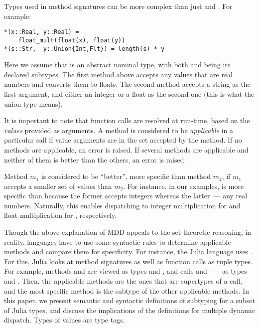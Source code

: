 Types used in method signatures can be more complex than 
just  and . For example:
\begin{verbatim}
*(x::Real, y::Real) = 
    float_mult(float(x), float(y))
*(s::Str,  y::Union{Int,Flt}) = length(s) * y
\end{verbatim}
Here we assume that  is an abstract nominal type, 
with both  and  being its declared subtypes.
The first method above accepts any values that are real numbers
and converts them to floats. %
The second method accepts a string as the first argument, and either an integer
or a float as the second one (this is what the union type means).

It is important to note that function calls are resolved at run-time,
based on the \emph{values} provided as arguments.
A method is considered to be \emph{applicable} in a particular call
if value arguments are in the set accepted by the method.
If no methods are applicable, an error is raised.
If several methods are applicable and neither of them is better than
the others, an error is raised.

Method $m_1$ is considered to be ``better'', more specific than method $m_2$,
if $m_1$ accepts a smaller set of values than $m_2$.
For instance, in our examples,  is more specific than
 because the former accepts integers 
whereas the latter~--- any real numbers.
Naturally, this enables dispatching to integer multiplication 
for  and float multiplication for , respectively.

Though the above explanation of MDD appeals to the set-theoretic reasoning,
in reality, languages have to use some syntactic rules to determine
applicable methods and compare them for specificity.
For instance, the Julia language uses .
For this, Julia looks at method signatures as well as function calls
as tuple types. For example, methods 
 and  are viewed as types
 and , and calls 
 and ~--- as types
 and .
Then, the applicable methods are the ones that are supertypes of a call,
and the most specific method is the subtype of the other applicable methods.
In this paper, we present semantic and syntactic definitions of subtyping
for a subset of Julia types, and discuss the implications of the definitions
for multiple dynamic dispatch. Types of values are type tags.
